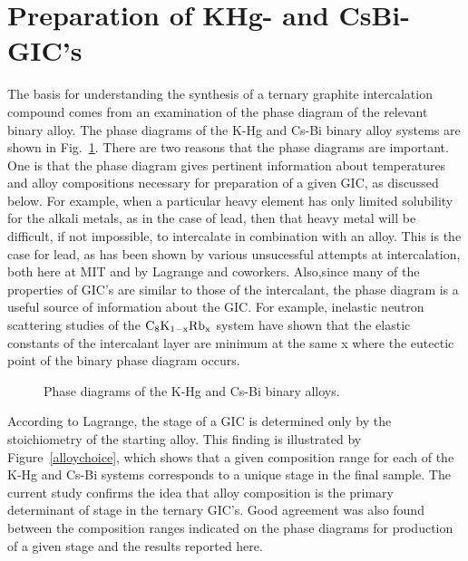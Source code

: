 \section{Preparation of KHg- and CsBi-GIC's}
\label{synth}

        The  basis for understanding  the synthesis of   a ternary graphite
intercalation compound  comes from an examination  of the phase  diagram of
the relevant binary alloy.  The phase diagrams of the K-Hg and Cs-Bi binary
alloy systems  are shown in  Fig.~\ref{phasediag}.  There  are  two reasons
that the phase diagrams are important.  One is that the phase diagram gives
pertinent information about temperatures  and alloy  compositions necessary
for preparation of a given  GIC, as discussed  below.   For example, when a
particular heavy element has only limited solubility for the alkali metals,
as in  the case of  lead,\cite{hansen58}  then  that   heavy metal will  be
difficult, if not impossible, to intercalate in combination  with an alloy.
This is  the  case for  lead, as   has been  shown by  various  unsucessful
attempts  at  intercalation, both  here  at   MIT  and   by Lagrange    and
coworkers.\cite{lagrange85} Also,since many of the properties of  GIC's are
similar  to  those of  the  intercalant,\cite{I94} the phase diagram  is  a
useful source of information about the GIC.  For example, inelastic neutron
scattering studies of the  $\rm C_8K_{1-x}Rb_x$ system  have shown that the
elastic constants of the intercalant layer are minimum at  the same x where
the eutectic point of the binary phase diagram occurs.\cite{neumann84}

\begin{figure}
\vspace{8in}
\caption[Phase diagrams of the K-Hg and Cs-Bi binary alloys.]{Phase 
diagrams of the K-Hg and Cs-Bi binary alloys.\cite{hansen58}}
\label{phasediag}
\end{figure}

        According  to  Lagrange\cite{lagrange87},   the  stage of  a GIC is
determined only by the  stoichiometry of  the starting alloy.  This finding
is  illustrated by  Figure~\ref{alloychoice},  which shows   that  a  given
composition range for each of  the K-Hg and Cs-Bi systems  corresponds to a
unique stage in the final sample.  The current study confirms the idea that
alloy composition is the primary determinant  of  stage in the  ternary GIC's.
Good  agreement was also found between  the composition ranges indicated on
the phase diagrams for production of a given stage and the results reported
here.

